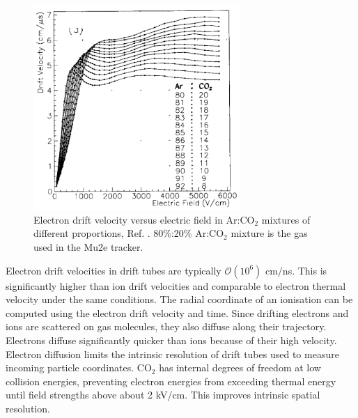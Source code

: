 \begin{figure}[!h]
    \centering
    \includegraphics[width =0.7\textwidth]{figures/png/Screenshot_20240330_102206.png}
    \caption[Electron drift velocity versus electric field in Ar:CO$_2$ mixtures.]{Electron drift velocity versus electric field in Ar:CO$_2$ mixtures of different proportions, Ref. \cite{ZHAO1994485}. 
    80\%:20\% Ar:CO$_2$ mixture is the gas used in the Mu2e tracker.}
    \label{fig:drift}
\end{figure}
Electron drift velocities in drift tubes are typically $\mathcal{O}(10^6)$ cm/ns.
This is significantly higher than ion drift velocities and comparable to electron thermal velocity under the same conditions. 
The radial coordinate of an ionisation can be computed using the electron drift velocity and time.
Since drifting electrons and ions are scattered on gas molecules, they also diffuse along their trajectory. 
Electrons diffuse significantly quicker than ions because of their high velocity. Electron diffusion limits 
the intrinsic resolution of drift tubes used to measure incoming particle coordinates. CO$_2$ has internal 
degrees of freedom at low collision energies, preventing electron energies from exceeding thermal energy until 
field strengths above about 2 kV/cm. This improves intrinsic spatial resolution.
